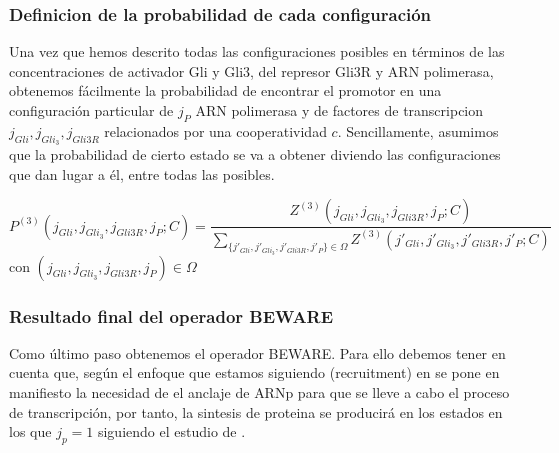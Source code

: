 \subsubsection{Definicion de la probabilidad de cada configuración}

Una vez que hemos descrito todas las configuraciones posibles en términos de las concentraciones de activador Gli y Gli3, del represor Gli3R y ARN polimerasa, obtenemos fácilmente la probabilidad de encontrar el promotor en una configuración particular de $j_P$ ARN polimerasa y de factores de transcripcion $j_{Gli}, j_{Gli_3}, j_{Gli3R}$ relacionados por una cooperatividad $c$. Sencillamente, asumimos que la probabilidad de cierto estado se va a obtener diviendo las configuraciones que dan lugar a él, entre todas las posibles.

\begin{equation}
P^{(3)}(j_{Gli}, j_{Gli_3}, j_{Gli3R},j_P;C)=\frac{Z^{(3)}(j_{Gli}, j_{Gli_3}, j_{Gli3R},j_P;C)}{\sum_{\{j'_{Gli}, j'_{Gli_3}, j'_{Gli3R},j'_P\}\in\Omega}Z^{(3)}(j'_{Gli}, j'_{Gli_3}, j'_{Gli3R},j'_P;C)}
\label{probabilidad}
\end{equation}
 con $(j_{Gli}, j_{Gli_3}, j_{Gli3R},j_P)\in\Omega$
\subsubsection{Resultado final del operador BEWARE}
Como último paso obtenemos el operador BEWARE. Para ello debemos tener en cuenta que, según el enfoque que estamos siguiendo (recruitment) en \cite{shea1985or} se pone en manifiesto la necesidad de el anclaje de ARNp para que se lleve a cabo el proceso de transcripción, por tanto, la sintesis de proteina se producirá en los estados en los que $j_p=1$ siguiendo el estudio de \cite{bintu2005transcriptional,frank2012versatility}.

